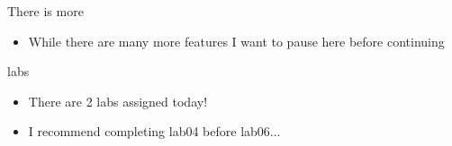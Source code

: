 \documentclass{beamer}
\begin{document}
\begin{frame}{There is more}
\begin{itemize}
\item While there are many more features I want to pause here before continuing
\end{itemize}
\end{frame}


\begin{frame}{labs}
\begin{itemize}
\item There are 2 labs assigned today!
\item I recommend completing lab04 before lab06...
\end{itemize}
\end{frame}
\end{document}
